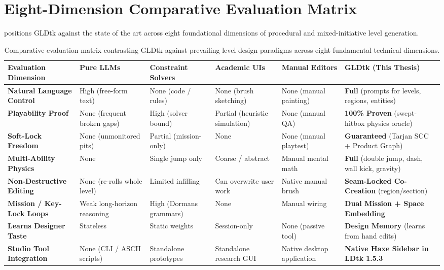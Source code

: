 \documentclass[11pt,a4paper]{report}
\theoremstyle{definition}
\theoremstyle{remark}
\begin{document}
\section{Eight-Dimension Comparative Evaluation Matrix}
 positions GLDtk against the state of the art across eight foundational dimensions of procedural and mixed-initiative level generation.

\begin{table}[htbp]
\centering
\small
\caption{Comparative evaluation matrix contrasting GLDtk against prevailing level design paradigms across eight fundamental technical dimensions.}
\label{tab:comparison}
\begin{tabularx}{\textwidth}{l p{2.2cm} p{2.4cm} p{2.4cm} p{2.2cm} X}
\toprule
\textbf{Evaluation Dimension} & \textbf{Pure LLMs} \newline \citep{sudhakaran2023mariogpt, todd2023level} & \textbf{Constraint Solvers} \newline \citep{smith2011tanagra, cooper2022sturgeon} & \textbf{Academic UIs} \newline \citep{liapis2013sentient, guzdial2019morai} & \textbf{Manual Editors} \newline \citep{benard2020ldtk} & \textbf{GLDtk} \newline (This Thesis) \\
\midrule
\textbf{Natural Language Control} & High (free-form text) & None (code / rules) & None (brush sketching) & None (manual painting) & \textbf{Full} (prompts for levels, regions, entities) \\
\addlinespace
\textbf{Playability Proof} & None (frequent broken gaps) & High (solver bound) & Partial (heuristic simulation) & None (manual QA) & \textbf{100\% Proven} (swept-hitbox physics oracle) \\
\addlinespace
\textbf{Soft-Lock Freedom} & None (unmonitored pits) & Partial (mission-only) & None & None (manual playtest) & \textbf{Guaranteed} (Tarjan SCC + Product Graph) \\
\addlinespace
\textbf{Multi-Ability Physics} & None & Single jump only & Coarse / abstract & Manual mental math & \textbf{Full} (double jump, dash, wall kick, gravity) \\
\addlinespace
\textbf{Non-Destructive Editing} & None (re-rolls whole level) & Limited infilling & Can overwrite user work & Native manual brush & \textbf{Seam-Locked Co-Creation} (region/section) \\
\addlinespace
\textbf{Mission / Key-Lock Loops} & Weak long-horizon reasoning & High (Dormans grammars) & None & Manual wiring & \textbf{Dual Mission + Space Embedding} \\
\addlinespace
\textbf{Learns Designer Taste} & Stateless & Static weights & Session-only & None (passive tool) & \textbf{Design Memory} (learns from hand edits) \\
\addlinespace
\textbf{Studio Tool Integration} & None (CLI / ASCII scripts) & Standalone prototypes & Standalone research GUI & Native desktop application & \textbf{Native Haxe Sidebar in LDtk 1.5.3} \\
\bottomrule
\end{tabularx}
\end{table}
\end{document}
